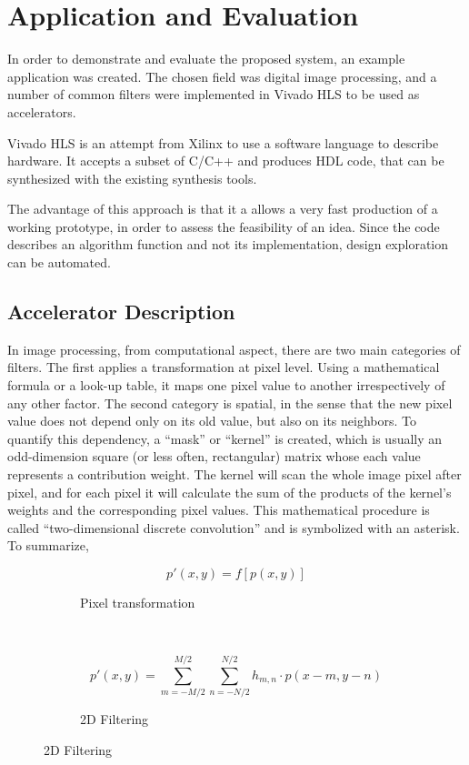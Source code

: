 \chapter{Application and Evaluation}

In order to demonstrate and evaluate the proposed system, an example application was created.
The chosen field was digital image processing, and a number of common filters were implemented
in Vivado HLS to be used as accelerators.

Vivado HLS is an attempt from Xilinx to use a software language to describe hardware.
It accepts a subset of C/C++ and produces HDL code, that can be synthesized with
the existing synthesis tools.

The advantage of this approach is that it a allows a very fast production of a working
prototype, in order to assess the feasibility of an idea. Since the code describes
an algorithm function and not its implementation, design exploration can be automated.


\section{Accelerator Description}

In image processing, from computational aspect, there are two main categories of filters.
The first applies a transformation at pixel level. Using a mathematical formula or a
look-up table, it maps one pixel value to another irrespectively of any other factor.
The second category is spatial, in the sense that the new pixel value does not depend only
on its old value, but also on its neighbors. To quantify this dependency, a ``mask'' or
``kernel'' is created, which is usually an odd-dimension square (or less often, rectangular)
matrix whose each value represents a contribution weight.
The kernel will scan the whole image pixel after pixel,
and for each pixel it will calculate the sum of the products of the kernel's weights
and the corresponding pixel values. This mathematical procedure is called
``two-dimensional discrete convolution'' and is symbolized with an asterisk.
To summarize,

\begin{figure}[H]
\centering
\begin{subfigure}[b]{.3\linewidth}
	\[
		p'(x,y) = f\left[p(x,y) \right]
	\]
	\caption{Pixel transformation}
\end{subfigure}
~\quad
\begin{subfigure}[b]{.6\linewidth}
	\[
		p'(x,y) = \sum_{m = -M/2}^{M/2}{
			\sum_{n = -N/2}^{N/2}{
				{h_{m,n}\cdot p(x - m, y - n)}
			}
		}
	\]
	\caption{2D Filtering}
\end{subfigure}
\end{figure}

